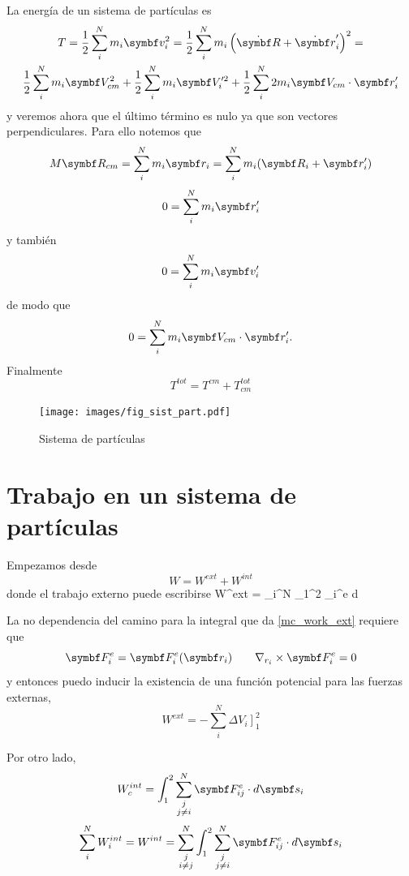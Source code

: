 \documentclass[10pt,oneside]{CBFT_book}
\begin{document}
La energía de un sistema de partículas es 
\begin{multline*}
	T = \frac{1}{2} \sum_i^N m_i \vb{v}_i^2 = 
	\frac{1}{2} \sum_i^N m_i \left( \dot{\vb{R}} + \dot{\vb{r}}_i' \right)^2 = \\
	\frac{1}{2} \sum_i^N m_i \vb{V}_{cm}^2  +
	\frac{1}{2} \sum_i^N m_i \vb{V}_i'^2 +
	\frac{1}{2} \sum_i^N 2 m_i \vb{V}_{cm} \cdot  \vb{r}_{i}' 
\end{multline*}
y veremos ahora que el último término es nulo ya que son vectores perpendiculares.
Para ello notemos que 
\[
	M \vb{R}_{cm} = \sum_i^N m_i \vb{r}_i = \sum_i^N m_i ( \vb{R}_i + \vb{r}_i' )
\]
\[
	0 = \sum_i^N m_i \vb{r}_i'
\]
y también 
\[
	0 = \sum_i^N m_i \vb{v}_i'
\]
de modo que 
\[
	0 = \sum_i^N m_i \vb{V}_{cm} \cdot \vb{r}_i'.
\]
Finalmente 
\[
	T^{tot} = T^{cm} + T_{cm}^{tot}
\]

\begin{figure}
	\begin{center}
	\texttt{[image: images/fig\_sist\_part.pdf]}	 
	\end{center}
	\caption{Sistema de partículas}
\end{figure} 

\section{Trabajo en un sistema de partículas}

Empezamos desde
\[
	W = W^{ext} + W^{int}
\]
donde el trabajo externo puede escribirse
\be
	W^{ext} = \sum_i^N \int_1^2 _i^e \cdot d
\label{mc_work_ext}
\ee

La no dependencia del camino para la integral que da \eqref{mc_work_ext} requiere que 
\[
	\vb{F}_i^e = \vb{F}_i^e( \vb{r}_i ) \qquad \nabla_{r_i} \times \vb{F}_i^e = 0
\]
y entonces puedo inducir la existencia de una función potencial para las fuerzas externas,
\[
	W^{ext} = - \sum_i^N  \left. \Delta V_i \right]_1^2 
\]

Por otro lado,
\[
	W^{int}_c = \int_1^2 \sum_{\substack{j\\j\neq i}}^N  \vb{F}_{ij}^e \cdot d\vb{s}_i  
\]
\[
	\sum_i^N W_i^{int} =  W^{int} = \sum_{\substack{j \\ i\neq j}}^N  
	\int_1^2 \sum_{\substack{j \\ j\neq i}}^N  \vb{F}_{ij}^e \cdot d\vb{s}_i  
\]
\end{document}
